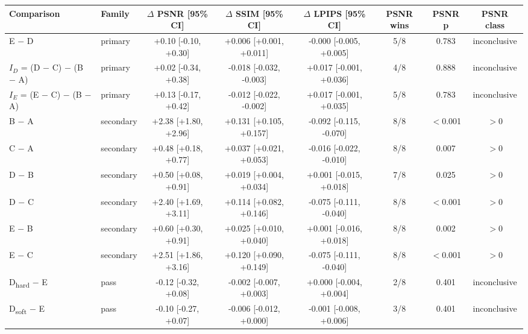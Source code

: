 \begin{tabular}{llcccccc}
\toprule
Comparison & Family & $\Delta$ PSNR [95\% CI] & $\Delta$ SSIM [95\% CI] & $\Delta$ LPIPS [95\% CI] & PSNR wins & PSNR p & PSNR class \\
\midrule
E $-$ D & primary & +0.10 [-0.10, +0.30] & +0.006 [+0.001, +0.011] & -0.000 [-0.005, +0.005] & 5/8 & 0.783 & inconclusive \\
$I_D$ = (D $-$ C) $-$ (B $-$ A) & primary & +0.02 [-0.34, +0.38] & -0.018 [-0.032, -0.003] & +0.017 [-0.001, +0.036] & 4/8 & 0.888 & inconclusive \\
$I_E$ = (E $-$ C) $-$ (B $-$ A) & primary & +0.13 [-0.17, +0.42] & -0.012 [-0.022, -0.002] & +0.017 [-0.001, +0.035] & 5/8 & 0.783 & inconclusive \\
B $-$ A & secondary & +2.38 [+1.80, +2.96] & +0.131 [+0.105, +0.157] & -0.092 [-0.115, -0.070] & 8/8 & $<$0.001 & $>$0 \\
C $-$ A & secondary & +0.48 [+0.18, +0.77] & +0.037 [+0.021, +0.053] & -0.016 [-0.022, -0.010] & 8/8 & 0.007 & $>$0 \\
D $-$ B & secondary & +0.50 [+0.08, +0.91] & +0.019 [+0.004, +0.034] & +0.001 [-0.015, +0.018] & 7/8 & 0.025 & $>$0 \\
D $-$ C & secondary & +2.40 [+1.69, +3.11] & +0.114 [+0.082, +0.146] & -0.075 [-0.111, -0.040] & 8/8 & $<$0.001 & $>$0 \\
E $-$ B & secondary & +0.60 [+0.30, +0.91] & +0.025 [+0.010, +0.040] & +0.001 [-0.016, +0.018] & 8/8 & 0.002 & $>$0 \\
E $-$ C & secondary & +2.51 [+1.86, +3.16] & +0.120 [+0.090, +0.149] & -0.075 [-0.111, -0.040] & 8/8 & $<$0.001 & $>$0 \\
D\textsubscript{hard} $-$ E & pass & -0.12 [-0.32, +0.08] & -0.002 [-0.007, +0.003] & +0.000 [-0.004, +0.004] & 2/8 & 0.401 & inconclusive \\
D\textsubscript{soft} $-$ E & pass & -0.10 [-0.27, +0.07] & -0.006 [-0.012, +0.000] & -0.001 [-0.008, +0.006] & 3/8 & 0.401 & inconclusive \\
\bottomrule
\end{tabular}
